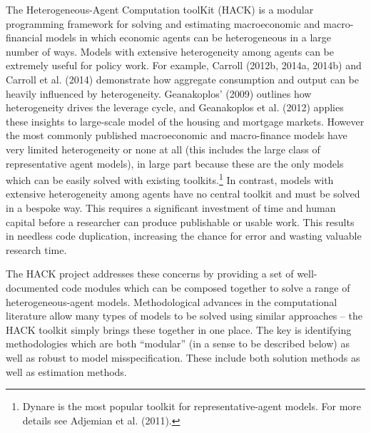 \documentclass[]{article}
\begin{document}
The Heterogeneous-Agent Computation toolKit (HACK) is a modular
programming framework for solving and estimating macroeconomic and
macro-financial models in which economic agents can be heterogeneous in
a large number of ways. Models with extensive heterogeneity among agents
can be extremely useful for policy work. For example, Carroll (2012b,
2014a, 2014b) and Carroll et al. (2014) demonstrate how aggregate
consumption and output can be heavily influenced by heterogeneity.
Geanakoplos' (2009) outlines how heterogeneity drives the leverage
cycle, and Geanakoplos et al. (2012) applies these insights to
large-scale model of the housing and mortgage markets. However the most
commonly published macroeconomic and macro-finance models have very
limited heterogeneity or none at all (this includes the large class of
representative agent models), in large part because these are the only
models which can be easily solved with existing toolkits.\footnote{Dynare
  is the most popular toolkit for representative-agent models. For more
  details see Adjemian et al. (2011).} In contrast, models with
extensive heterogeneity among agents have no central toolkit and must be
solved in a bespoke way. This requires a significant investment of time
and human capital before a researcher can produce publishable or usable
work. This results in needless code duplication, increasing the chance
for error and wasting valuable research time.

The HACK project addresses these concerns by providing a set of
well-documented code modules which can be composed together to solve a
range of heterogeneous-agent models. Methodological advances in the
computational literature allow many types of models to be solved using
similar approaches -- the HACK toolkit simply brings these together in
one place. The key is identifying methodologies which are both
``modular'' (in a sense to be described below) as well as robust to
model misspecification. These include both solution methods as well as
estimation methods.
\href{We\%20outline\%20a\%20number\%20of\%20specific\%20a}{}
\end{document}
